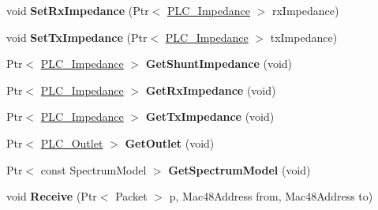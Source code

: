 \begin{DoxyCompactItemize}
\item 
\hypertarget{classns3_1_1PLC__NetDevice_a02261dd5a98019f29b9ae41d38af8e6f}{void {\bfseries \-Set\-Rx\-Impedance} (\-Ptr$<$ \hyperlink{classns3_1_1PLC__ValueBase}{\-P\-L\-C\-\_\-\-Impedance} $>$ rx\-Impedance)}\label{classns3_1_1PLC__NetDevice_a02261dd5a98019f29b9ae41d38af8e6f}

\item 
\hypertarget{classns3_1_1PLC__NetDevice_aadb5e376ec915d39d8e9dee0542f5d7c}{void {\bfseries \-Set\-Tx\-Impedance} (\-Ptr$<$ \hyperlink{classns3_1_1PLC__ValueBase}{\-P\-L\-C\-\_\-\-Impedance} $>$ tx\-Impedance)}\label{classns3_1_1PLC__NetDevice_aadb5e376ec915d39d8e9dee0542f5d7c}

\item 
\hypertarget{classns3_1_1PLC__NetDevice_a7dd8f090ad4ab15d19076fde6e21d3de}{\-Ptr$<$ \hyperlink{classns3_1_1PLC__ValueBase}{\-P\-L\-C\-\_\-\-Impedance} $>$ {\bfseries \-Get\-Shunt\-Impedance} (void)}\label{classns3_1_1PLC__NetDevice_a7dd8f090ad4ab15d19076fde6e21d3de}

\item 
\hypertarget{classns3_1_1PLC__NetDevice_a2ba13f286709decb44130dc3e0be0564}{\-Ptr$<$ \hyperlink{classns3_1_1PLC__ValueBase}{\-P\-L\-C\-\_\-\-Impedance} $>$ {\bfseries \-Get\-Rx\-Impedance} (void)}\label{classns3_1_1PLC__NetDevice_a2ba13f286709decb44130dc3e0be0564}

\item 
\hypertarget{classns3_1_1PLC__NetDevice_a99a4bbd1d5b009af82bd4b869fa2fa2e}{\-Ptr$<$ \hyperlink{classns3_1_1PLC__ValueBase}{\-P\-L\-C\-\_\-\-Impedance} $>$ {\bfseries \-Get\-Tx\-Impedance} (void)}\label{classns3_1_1PLC__NetDevice_a99a4bbd1d5b009af82bd4b869fa2fa2e}

\item 
\hypertarget{classns3_1_1PLC__NetDevice_a83980ae9391fc45136fb972e01992ab5}{\-Ptr$<$ \hyperlink{classns3_1_1PLC__Outlet}{\-P\-L\-C\-\_\-\-Outlet} $>$ {\bfseries \-Get\-Outlet} (void)}\label{classns3_1_1PLC__NetDevice_a83980ae9391fc45136fb972e01992ab5}

\item 
\hypertarget{classns3_1_1PLC__NetDevice_ae5124a3ee442a40efa82217f6f4faf4e}{\-Ptr$<$ const \-Spectrum\-Model $>$ {\bfseries \-Get\-Spectrum\-Model} (void)}\label{classns3_1_1PLC__NetDevice_ae5124a3ee442a40efa82217f6f4faf4e}

\item 
\hypertarget{classns3_1_1PLC__NetDevice_a8819c37779adc3bfac770a29369081bf}{void {\bfseries \-Receive} (\-Ptr$<$ \-Packet $>$ p, \-Mac48\-Address from, \-Mac48\-Address to)}\label{classns3_1_1PLC__NetDevice_a8819c37779adc3bfac770a29369081bf}


\end{DoxyCompactItemize}
